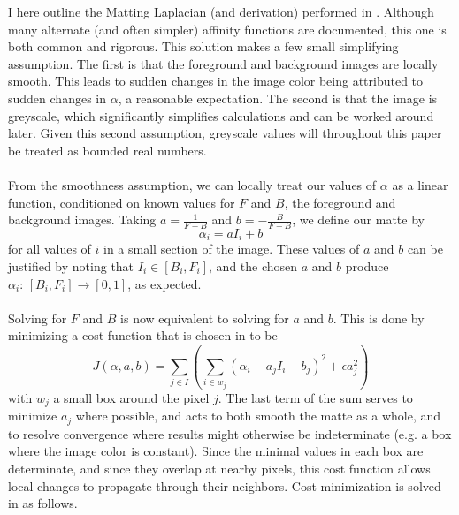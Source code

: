 I here outline the Matting Laplacian (and derivation) performed in \cite{levin08}. Although many alternate (and often simpler) affinity functions are documented, this one is both common and rigorous. This solution makes a few small simplifying assumption. The first is that the foreground and background images are locally smooth. This leads to sudden changes in the image color being attributed to sudden changes in $\alpha$, a reasonable expectation. The second is that the image is greyscale, which significantly simplifies calculations and can be worked around later. Given this second assumption, greyscale values will throughout this paper be treated as bounded real numbers.
\\\\
From the smoothness assumption, we can locally treat our values of $\alpha$ as a linear function, conditioned on known values for $F$ and $B$, the foreground and background images. Taking $a=\frac{1}{F-B}$ and $b=-\frac{B}{F-B}$, we define our matte by
\[\alpha_i=aI_i+b\]
for all values of $i$ in a small section of the image. These values of $a$ and $b$ can be justified by noting that $I_i\in[B_i,F_i]$, and the chosen $a$ and $b$ produce $\alpha_i:\,[B_i,F_i]\to[0,1]$, as expected.
\\\\
Solving for $F$ and $B$ is now equivalent to solving for $a$ and $b$. This is done by minimizing a cost function that is chosen in \cite{levin08} to be
\[J(\alpha,a,b)=
	\sum_{j\in I}\left(\sum_{i\in w_j}\left(
		\alpha_i-a_jI_i-b_j\right)^2+\epsilon
		a_j^2\right)\]
with $w_j$ a small box around the pixel $j$. The last term of the sum serves to minimize $a_j$ where possible, and acts to both smooth the matte as a whole, and to resolve convergence where results might otherwise be indeterminate (e.g. a box where the image color is constant). Since the minimal values in each box are determinate, and since they overlap at nearby pixels, this cost function allows local changes to propagate through their neighbors. Cost minimization is solved in \cite{levin08} as follows.

